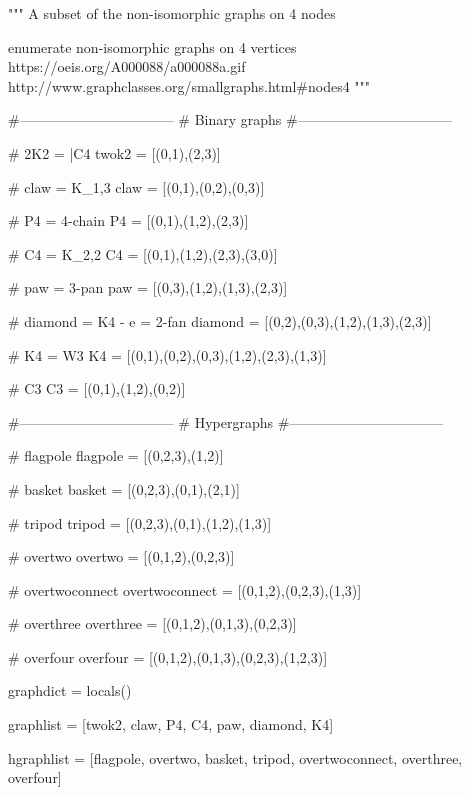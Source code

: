 \begin{python}
"""
A subset of the non-isomorphic graphs on 4 nodes

enumerate non-isomorphic graphs
on 4 vertices
https://oeis.org/A000088/a000088a.gif
http://www.graphclasses.org/smallgraphs.html#nodes4
"""

#---------------------------------
# Binary graphs
#---------------------------------

# 2K2 = \bar{C4}
twok2 = [(0,1),(2,3)]

# claw = K_{1,3}
claw = [(0,1),(0,2),(0,3)]

# P4 = 4-chain
P4 = [(0,1),(1,2),(2,3)]

# C4 = K_{2,2}
C4 = [(0,1),(1,2),(2,3),(3,0)]

# paw = 3-pan
paw = [(0,3),(1,2),(1,3),(2,3)]

# diamond = K4 - e = 2-fan
diamond = [(0,2),(0,3),(1,2),(1,3),(2,3)]

# K4 = W3
K4 = [(0,1),(0,2),(0,3),(1,2),(2,3),(1,3)]

# C3
C3 = [(0,1),(1,2),(0,2)]

#---------------------------------
# Hypergraphs
#---------------------------------

# flagpole
flagpole = [(0,2,3),(1,2)]

# basket
basket = [(0,2,3),(0,1),(2,1)]

# tripod
tripod = [(0,2,3),(0,1),(1,2),(1,3)]

# overtwo
overtwo = [(0,1,2),(0,2,3)]

# overtwoconnect
overtwoconnect = [(0,1,2),(0,2,3),(1,3)]

# overthree
overthree = [(0,1,2),(0,1,3),(0,2,3)]

# overfour
overfour = [(0,1,2),(0,1,3),(0,2,3),(1,2,3)]

graphdict = locals()

graphlist = [twok2,
             claw,
             P4,
             C4,
             paw,
             diamond,
             K4]

hgraphlist = [flagpole,
              overtwo,
              basket,
              tripod,
              overtwoconnect,
              overthree,
              overfour]

\end{python}
